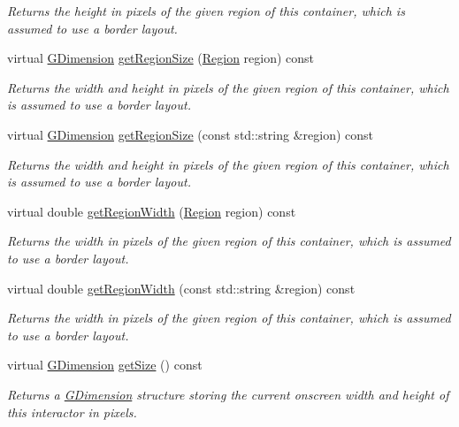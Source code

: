 \begin{DoxyCompactItemize}
\begin{DoxyCompactList}\small\item\em Returns the height in pixels of the given region of this container, which is assumed to use a border layout. \end{DoxyCompactList}\item 
virtual \mbox{\hyperlink{structGDimension}{G\+Dimension}} \mbox{\hyperlink{classGContainer_a3b5db9ffbd4b32260f80634f162dba4e}{get\+Region\+Size}} (\mbox{\hyperlink{classGContainer_a81a01a86de31071a92e6cce0bab9bc4b}{Region}} region) const
\begin{DoxyCompactList}\small\item\em Returns the width and height in pixels of the given region of this container, which is assumed to use a border layout. \end{DoxyCompactList}\item 
virtual \mbox{\hyperlink{structGDimension}{G\+Dimension}} \mbox{\hyperlink{classGContainer_a68b18b38b72cb8779fca0c3882549a6b}{get\+Region\+Size}} (const std\+::string \&region) const
\begin{DoxyCompactList}\small\item\em Returns the width and height in pixels of the given region of this container, which is assumed to use a border layout. \end{DoxyCompactList}\item 
virtual double \mbox{\hyperlink{classGContainer_a96e2005c3f447a8679c3c32d3fc02de1}{get\+Region\+Width}} (\mbox{\hyperlink{classGContainer_a81a01a86de31071a92e6cce0bab9bc4b}{Region}} region) const
\begin{DoxyCompactList}\small\item\em Returns the width in pixels of the given region of this container, which is assumed to use a border layout. \end{DoxyCompactList}\item 
virtual double \mbox{\hyperlink{classGContainer_ab169dab454fc90f1c845b91b4e1a8a14}{get\+Region\+Width}} (const std\+::string \&region) const
\begin{DoxyCompactList}\small\item\em Returns the width in pixels of the given region of this container, which is assumed to use a border layout. \end{DoxyCompactList}\item 
virtual \mbox{\hyperlink{structGDimension}{G\+Dimension}} \mbox{\hyperlink{classGInteractor_a7b4eec96a2bdc6420695d5796a78eea9}{get\+Size}} () const
\begin{DoxyCompactList}\small\item\em Returns a \mbox{\hyperlink{structGDimension}{G\+Dimension}} structure storing the current onscreen width and height of this interactor in pixels. \end{DoxyCompactList}\item 

\end{DoxyCompactItemize}
